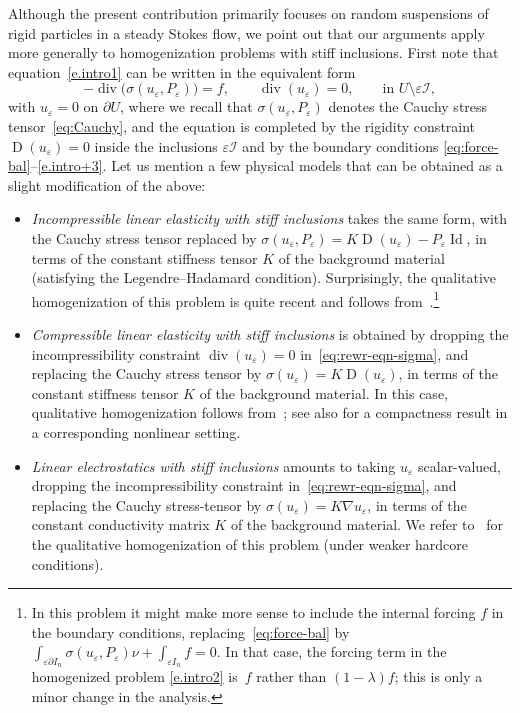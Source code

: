 \documentclass[JEP,XML,SOM,Unicode,published]{cedram}
\let\mathcal\mathscr
\theoremstyle{plain}
\theoremstyle{definition}
\newcommand{\e}{\varepsilon}
\newcommand{\Ic}{\mathcal I}
\newcommand{\Id}{\operatorname{Id}}
\newcommand{\D}{\operatorname{D}}
\newcommand{\Div}{{\operatorname{div}}}
\begin{document}
Although the present contribution primarily focuses on random suspensions of rigid particles in a steady Stokes flow, we point out
that our arguments apply more generally to homogenization problems with stiff inclusions.
First note that equation~\eqref{e.intro1} can be written in the equivalent form
\begin{equation}\label{eq:rewr-eqn-sigma}
-\Div\big(\sigma(u_\e,P_\e)\big)=f,\qquad\Div (u_\e)=0,\qquad\text{in $U\setminus \e\Ic$},
\end{equation}
with $u_\e=0$ on $\partial U$, where we recall that $\sigma(u_\e,P_\e)$ denotes the Cauchy stress tensor~\eqref{eq:Cauchy},
and the equation is completed by the rigidity constraint $\D(u_\e)=0$ inside the inclusions $\e\Ic$
and by the boundary conditions \eqref{eq:force-bal}--\eqref{e.intro+3}.
Let us mention a few physical models that can be obtained as a slight modification of the above:
\begin{itemize}
\item \emph{Incompressible linear elasticity with stiff inclusions} takes the same form, with the Cauchy stress tensor replaced by $\sigma(u_\e,P_\e)=K\D(u_\e)-P_\e\Id$,
in terms of the constant stiffness tensor $K$ of the background material (satisfying the Legendre--Hadamard condition).
Surprisingly, the qualitative homogenization of this problem is quite recent and follows from~\cite{DG-19}.\footnote{In this problem it might make more sense to include the internal forcing $f$ in the boundary conditions, replacing~\eqref{eq:force-bal} by $\int_{\e\partial I_n}\sigma(u_\e,P_\e)\nu+\int_{\e I_n} f=0$. In that case, the forcing term in the homogenized problem \eqref{e.intro2} is~$f$ rather than $(1-\lambda)f$; this is only a minor change in the analysis.}
\item \emph{Compressible linear elasticity with stiff inclusions} is obtained by dropping the incompressibility constraint $\Div (u_\e)=0$ in~\eqref{eq:rewr-eqn-sigma}, and replacing the Cauchy stress tensor by $\sigma(u_\e)=K\D(u_\e)$, in terms of the constant stiffness tensor $K$ of the background material.
In this case, qualitative homogenization follows from~\cite[Chap.\,3]{JKO94};
see also \cite{Braides-Garroni-95} for a compactness result in a corresponding nonlinear setting.
\item \emph{Linear electrostatics with stiff inclusions} amounts to taking $u_\e$ scalar-valued, dropping the incompressibility constraint in~\eqref{eq:rewr-eqn-sigma}, and replacing the Cauchy stress-tensor by $\sigma(u_\e)=K\nabla u_\e$, in terms of the constant conductivity matrix $K$ of the background material. We refer to~\cite[Chap.\,3]{JKO94} for the qualitative homogenization of this problem (under weaker hardcore conditions).
\end{itemize}
\end{document}
